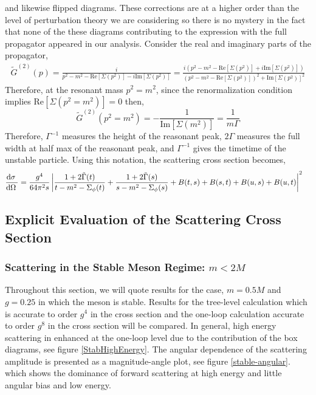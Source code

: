 \documentclass{article}
\begin{document}
and likewise flipped diagrams.
These corrections are at a higher order than the level of perturbation theory we are considering so there is no mystery in the fact that none of the these diagrams contributing to the expression with the full propagator appeared in our analysis.
Consider the real and imaginary parts of the propagator,
\begin{align*}
\tilde{G}^{(2)}(p) = \frac{i}{p^2 - m^2 - \mathrm{Re}[\Sigma(p^2)] - i \mathrm{Im}[\Sigma(p^2)]} = \frac{i(p^2 - m^2 - \mathrm{Re}[\Sigma(p^2)] + i \mathrm{Im}[\Sigma(p^2)])}{(p^2 - m^2 - \mathrm{Re}[\Sigma(p^2)])^2 + \mathrm{Im}[\Sigma(p^2)]^2}
\end{align*}
Therefore, at the resonant mass $p^2 = m^2$, since the renormalization condition implies $\mathrm{Re}[\Sigma(p^2 = m^2)] = 0$ then,
\[ \tilde{G}^{(2)}(p^2 = m^2) = - \frac{1}{\mathrm{Im}[\Sigma(m^2)]} = \frac{1}{m \Gamma} \]
Therefore, $\Gamma^{-1}$ measures the height of the reasonant peak, $2 \Gamma$ measures the full width at half max of the reasonant peak, and $\Gamma^{-1}$ gives the timetime of the unstable particle.
Using this notation, the scattering cross section becomes, 
\begin{align*}
\frac{\mathrm{d}\sigma \:}{\mathrm{d}\Omega \:} 
&= \frac{g^4}{64 \pi^2 s} \left| \frac{1 + 2\tilde{\Gamma}(t)}{t - m^2 - \Sigma_\phi(t)} + \frac{1 + 2\tilde{\Gamma}(s)}{s - m^2 - \Sigma_\phi(s)} + B(t, s) + B(s, t) + B(u, s) + B(u, t)  \right|^2 
\end{align*}

\subsection{Explicit Evaluation of the Scattering Cross Section}

\subsubsection{Scattering in the Stable Meson Regime: $m < 2 M$}
Throughout this section, we will quote results for the case, $m = 0.5M$ and $g = 0.25$ in which the meson is stable. Results for the tree-level calculation which is accurate to order $g^4$ in the cross section and the one-loop calculation accurate to order $g^8$ in the cross section will be compared. In general, high energy scattering in enhanced at the one-loop level due to the contribution of the box diagrams, see figure \ref{StabHighEnergy}. The angular dependence of the scattering amplitude is presented as a magnitude-angle plot, see figure \ref{stable-angular}. which shows the dominance of forward scattering at high energy and little angular bias and low energy.
\end{document}

